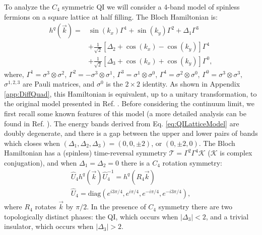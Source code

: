 \documentclass[%
 reprint,
 amsmath,amssymb,
 aps,
]{revtex4-1}
\begin{document}
To analyze the $C_4$ symmetric QI we will consider a 4-band model of spinless fermions on a square lattice at half filling. The Bloch Hamiltonian is:
\begin{equation}\begin{split}
h^{q}(\vec{k}) = &\sin(k_x)\Gamma^1  + \sin(k_y)\Gamma^2 + \Delta_1 \Gamma^3\\
&+\tfrac{1}{\sqrt{2}}\left[\Delta_2 + \cos(k_x)-\cos(k_y)\right]\Gamma^4 \\&+\tfrac{1}{\sqrt{2}}\left[\Delta_3 + \cos(k_x)+\cos(k_y)\right]\Gamma^0,
\label{eq:QILatticeModel}\end{split}\end{equation}
where, $\Gamma^1 = \sigma^3 \otimes \sigma^2$, $\Gamma^2 = -\sigma^3 \otimes \sigma^1$, $\Gamma^3 = \sigma^1 \otimes \sigma^0$, $\Gamma^4 = \sigma^2 \otimes \sigma^0$, $\Gamma^0 = \sigma^3\otimes \sigma^3,$  $\sigma^{1,2,3}$ are Pauli matrices, and $\sigma^0$ is the $2\times 2$ identity. As shown in Appendix \ref{app:DiffQuad}, this Hamiltonian is equivalent, up to a unitary transformation, to the original model presented in Ref. . Before considering the continuum limit, we first recall some known features of this model (a more detailed analysis can be found in Ref. ). The energy bands derived from Eq. \ref{eq:QILatticeModel} are doubly degenerate, and there is a gap between the upper and lower pairs of bands which closes when $(\Delta_1,\Delta_2,\Delta_3) = (0,0,\pm 2)$, or $(0,\pm 2,0)$. The Bloch Hamiltonian has a (spinless) time-reversal symmetry $\mathcal{T} = \Gamma^2\Gamma^4 \mathcal{K}$ ($\mathcal{K}$ is complex conjugation), and when $\Delta_1 = \Delta_2 = 0$ there is a $C_4$ rotation symmetry:
\begin{equation}\begin{gathered}
\hat{U}_4 h^q(\vec{k}) \hat{U}^{-1}_4 = h^q(R_4\vec{k})\\
\hat{U}_4 = \text{diag}(e^{i3\pi/4},e^{i\pi/4},e^{-i\pi/4}, e^{-i3\pi/4}),
\label{eq:C4Def}\end{gathered}\end{equation}
where $R_4$ rotates $\vec{k}$ by $\pi/2$. In the presence of $C_4$ symmetry there are two topologically distinct phases: the QI, which occurs when $|\Delta_3|<2$, and a trivial insulator, which occurs when $|\Delta_3|>2$. 
\end{document}
